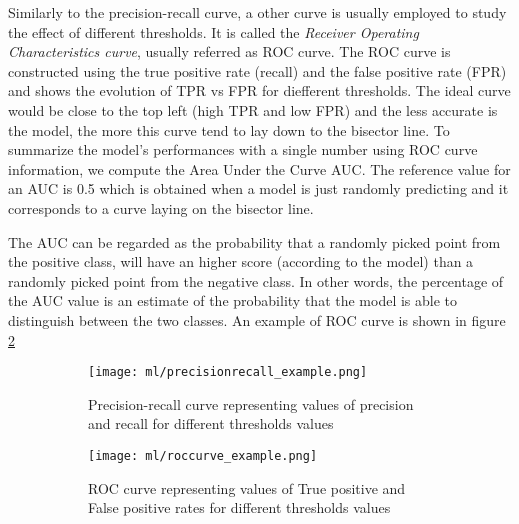 \documentclass[11pt]{report}
\begin{document}
Similarly to the precision-recall curve, a other curve is usually employed to study the effect of different thresholds. It is called the \emph{Receiver Operating Characteristics curve}, usually referred as ROC curve.
The ROC curve is constructed using the true positive rate (recall) and the false positive rate (FPR) and shows the evolution of TPR vs FPR for diefferent thresholds.
The ideal curve would be close to the top left (high TPR and low FPR) and the less accurate is the model, the more this curve tend to lay down to the bisector line.
To summarize the model's performances with a single number using ROC curve information, we compute the Area Under the Curve AUC.
The reference value for an AUC is 0.5 which is obtained when a model is just randomly predicting and it corresponds to a curve laying on the bisector line.

The AUC can be regarded as the probability that a randomly picked point from the positive class, will have an higher score (according to the model) than a randomly picked point from the negative class.
In other words, the percentage of the AUC value is an estimate of the probability that the model is able to distinguish between the two classes.
An example of ROC curve is shown in figure \ref{fig:roccurve}


\begin{figure}
\centering
\begin{subfigure}[t]{0.4\textwidth}
\texttt{[image: ml/precisionrecall\_example.png]}
\caption{Precision-recall curve representing values of precision and recall for different thresholds values}
\label{fig:precisionrecall}
\end{subfigure}
\begin{subfigure}[t]{0.43\textwidth}
\texttt{[image: ml/roccurve\_example.png]}
\caption{ROC curve representing values of True positive and False positive rates for different thresholds values}
\label{fig:roccurve}
\end{subfigure}
\caption{}
\label{}
\end{figure}
\end{document}
